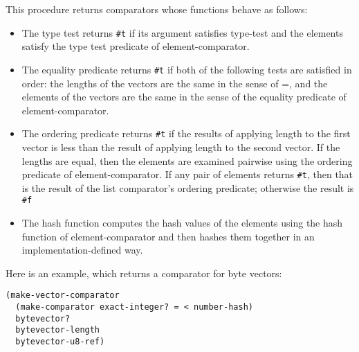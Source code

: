 \begin{entry}{%
  }

  This procedure returns comparators whose functions behave as
  follows: 

  \begin{itemize}
  \item The type test returns \texttt{\#t} if its argument satisfies
    type-test and the elements satisfy the type test predicate of
    element-comparator.
  \item The equality predicate returns \texttt{\#t} if both of the
    following tests are satisfied in order: the lengths of the vectors
    are the same in the sense of =, and the elements of the vectors
    are the same in the sense of the equality predicate of
    element-comparator.
  \item The ordering predicate returns \texttt{\#t} if the results of
    applying length to the first vector is less than the result of
    applying length to the second vector. If the lengths are equal,
    then the elements are examined pairwise using the ordering
    predicate of element-comparator.  If any pair of elements returns
    \texttt{\#t}, then that is the result of the list comparator's
    ordering predicate; otherwise the result is \texttt{\#f}
  \item The hash function computes the hash values of the elements
    using the hash function of element-comparator and then hashes them
    together in an implementation-defined way.
  \end{itemize}

  Here is an example, which returns a comparator for byte vectors:

\begin{verbatim}
(make-vector-comparator
  (make-comparator exact-integer? = < number-hash)
  bytevector?
  bytevector-length
  bytevector-u8-ref)
\end{verbatim}
\end{entry}

